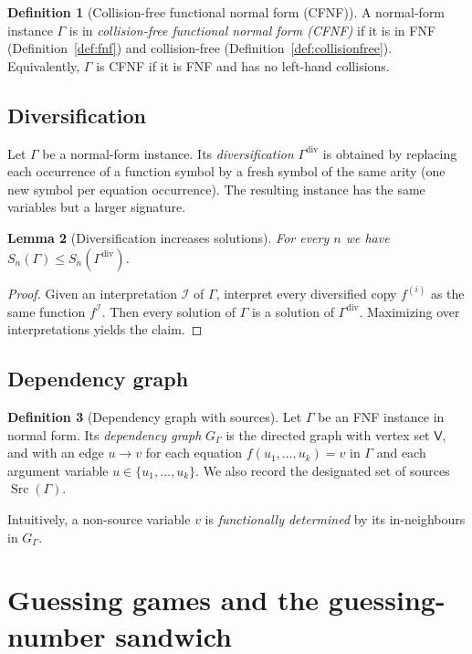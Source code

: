 \documentclass[11pt]{article}
\theoremstyle{definition}
\newtheorem{definition}{Definition}[section]
\theoremstyle{plain}
\newtheorem{lemma}[definition]{Lemma}
\newcommand{\Vars}{\mathsf{V}}
\newcommand{\Sn}{S_n}
\DeclareMathOperator{\Src}{Src}
\begin{document}
\begin{definition}[Collision-free functional normal form (CFNF)]
\label{def:cfnf}
A normal-form instance $\Gamma$ is in \emph{collision-free functional normal form (CFNF)} if it is in FNF
(Definition~\ref{def:fnf}) and collision-free (Definition~\ref{def:collisionfree}).
Equivalently, $\Gamma$ is CFNF if it is FNF and has no left-hand collisions.
\end{definition}

\subsection{Diversification}
\label{subsec:div}
Let $\Gamma$ be a normal-form instance.  Its \emph{diversification} $\Gamma^{\mathrm{div}}$ is obtained by
replacing each occurrence of a function symbol by a fresh symbol of the same arity (one new symbol per
equation occurrence).  The resulting instance has the same variables but a larger signature.

\begin{lemma}[Diversification increases solutions]
\label{lem:div-easy}
For every $n$ we have $\Sn(\Gamma)\le \Sn(\Gamma^{\mathrm{div}})$.
\end{lemma}

\begin{proof}
Given an interpretation $\mathcal I$ of $\Gamma$, interpret every diversified copy $f^{(i)}$ as the same
function $f^\mathcal I$.  Then every solution of $\Gamma$ is a solution of $\Gamma^{\mathrm{div}}$.
Maximizing over interpretations yields the claim.
\end{proof}

\subsection{Dependency graph}
\begin{definition}[Dependency graph with sources]
Let $\Gamma$ be an FNF instance in normal form.
Its \emph{dependency graph} $G_\Gamma$ is the directed graph with vertex set $\Vars$, and with an edge
$u\to v$ for each equation $f(u_1,\dots,u_k)=v$ in $\Gamma$ and each argument variable $u\in\{u_1,\dots,u_k\}$.
We also record the designated set of sources $\Src(\Gamma)$.
\end{definition}

Intuitively, a non-source variable $v$ is \emph{functionally determined} by its in-neighbours in $G_\Gamma$.

\section{Guessing games and the guessing-number sandwich}
\label{sec:guess}
\end{document}

